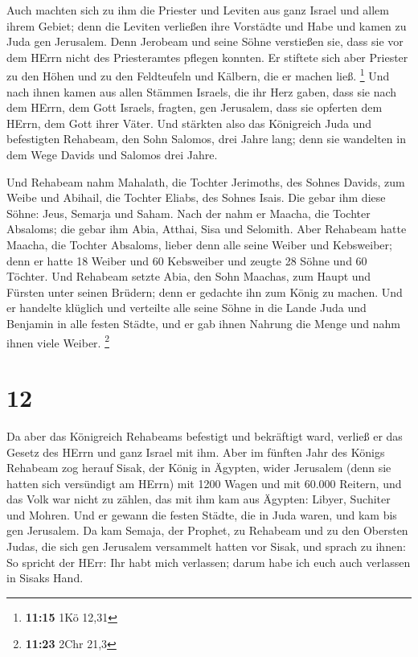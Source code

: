  Auch machten sich zu ihm die Priester und Leviten aus ganz
Israel und allem ihrem Gebiet;  denn die Leviten verließen
ihre Vorstädte und Habe und kamen zu Juda gen Jerusalem. Denn Jerobeam
und seine Söhne verstießen sie, dass sie vor dem HErrn nicht des
Priesteramtes pflegen konnten.  Er stiftete sich aber
Priester zu den Höhen und zu den Feldteufeln und Kälbern, die er machen
ließ. \footnote{\textbf{11:15} 1Kö 12,31}  Und nach ihnen
kamen aus allen Stämmen Israels, die ihr Herz gaben, dass sie nach dem
HErrn, dem Gott Israels, fragten, gen Jerusalem, dass sie opferten dem
HErrn, dem Gott ihrer Väter.  Und stärkten also das
Königreich Juda und befestigten Rehabeam, den Sohn Salomos, drei Jahre
lang; denn sie wandelten in dem Wege Davids und Salomos drei Jahre.

 Und Rehabeam nahm Mahalath, die Tochter Jerimoths, des
Sohnes Davids, zum Weibe und Abihail, die Tochter Eliabs, des Sohnes
Isais.  Die gebar ihm diese Söhne: Jeus, Semarja und Saham.
 Nach der nahm er Maacha, die Tochter Absaloms; die gebar
ihm Abia, Atthai, Sisa und Selomith.  Aber Rehabeam hatte
Maacha, die Tochter Absaloms, lieber denn alle seine Weiber und
Kebsweiber; denn er hatte 18 Weiber und 60 Kebsweiber und zeugte 28
Söhne und 60 Töchter.  Und Rehabeam setzte Abia, den Sohn
Maachas, zum Haupt und Fürsten unter seinen Brüdern; denn er gedachte
ihn zum König zu machen.  Und er handelte klüglich und
verteilte alle seine Söhne in die Lande Juda und Benjamin in alle festen
Städte, und er gab ihnen Nahrung die Menge und nahm ihnen viele Weiber.
\footnote{\textbf{11:23} 2Chr 21,3}

\hypertarget{section-3}{%
\section{12}\label{section-3}}

 Da aber das Königreich Rehabeams befestigt und bekräftigt
ward, verließ er das Gesetz des HErrn und ganz Israel mit ihm.
 Aber im fünften Jahr des Königs Rehabeam zog herauf Sisak,
der König in Ägypten, wider Jerusalem (denn sie hatten sich versündigt
am HErrn)  mit 1200 Wagen und mit 60.000 Reitern, und das
Volk war nicht zu zählen, das mit ihm kam aus Ägypten: Libyer, Suchiter
und Mohren.  Und er gewann die festen Städte, die in Juda
waren, und kam bis gen Jerusalem.  Da kam Semaja, der
Prophet, zu Rehabeam und zu den Obersten Judas, die sich gen Jerusalem
versammelt hatten vor Sisak, und sprach zu ihnen: So spricht der HErr:
Ihr habt mich verlassen; darum habe ich euch auch verlassen in Sisaks
Hand.

